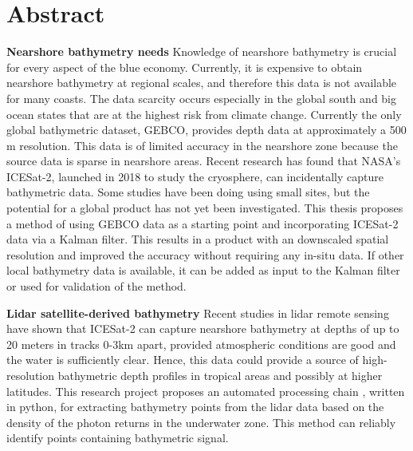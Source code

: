 \chapter*{Abstract}

\noindent\textbf{Nearshore bathymetry needs} Knowledge of nearshore bathymetry is crucial for every aspect of the blue economy. Currently, it is expensive to obtain nearshore bathymetry at regional scales, and therefore this data is not available for many coasts. The data scarcity occurs especially in the global south and big ocean states that are at the highest risk from climate change. Currently the only global bathymetric dataset, GEBCO, provides depth data at approximately a 500 m resolution. This data is of limited accuracy in the nearshore zone because the source data is sparse in nearshore areas. Recent research has found that NASA's ICESat-2, launched in 2018 to study the cryosphere, can incidentally capture bathymetric data. Some studies have been doing using small sites, but the potential for a global product has not yet been investigated. This thesis proposes a method of using GEBCO data as a starting point and incorporating ICESat-2 data via a Kalman filter. This results in a product with an downscaled spatial resolution and improved the accuracy without requiring any in-situ data. If other local bathymetry data is available, it can be added as input to the Kalman filter or used for validation of the method. 


\noindent\textbf{Lidar satellite-derived bathymetry} Recent studies in lidar remote sensing have shown that ICESat-2 can capture nearshore bathymetry at depths of up to 20 meters in tracks 0-3km apart, provided atmospheric conditions are good and the water is sufficiently clear. Hence, this data could provide a source of high-resolution bathymetric depth profiles in tropical areas and possibly at higher latitudes. This research project proposes an automated processing chain , written in python, for extracting bathymetry points from the lidar data based on the density of the photon returns in the underwater zone. This method can reliably identify points containing bathymetric signal. 


